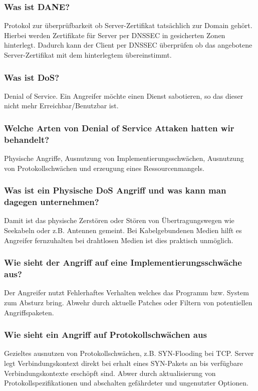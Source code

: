 	\subsubsection{Was ist DANE?}
	Protokol zur überprüfbarkeit ob Server-Zertifikat tatsächlich zur Domain gehört. Hierbei werden Zertifikate für Server per DNSSEC in gesicherten Zonen hinterlegt. Dadurch kann der Client per DNSSEC überprüfen ob das angebotene Server-Zertifikat mit dem hinterlegtem übereinstimmt.
	
	\subsubsection{Was ist DoS?}
	Denial of Service. Ein Angreifer möchte einen Dienst sabotieren, so das dieser nicht mehr Erreichbar/Benutzbar ist.
	
	\subsubsection{Welche Arten von Denial of Service Attaken hatten wir behandelt?}
	Physische Angriffe, Ausnutzung von Implementierungsschwächen, Ausnutzung von Protokollschwächen und erzeugung eines Ressourcenmangels.
	
	\subsubsection{Was ist ein Physische DoS Angriff und was kann man dagegen unternehmen?}
	Damit ist das physische Zerstören oder Stören von Übertragungswegen wie Seekabeln oder z.B. Antennen gemeint. Bei Kabelgebundenen Medien hilft es Angreifer fernzuhalten bei drahtlosen Medien ist dies praktisch unmöglich.
	
	\subsubsection{Wie sieht der Angriff auf eine Implementierungsschwäche aus?}
	Der Angreifer nutzt Fehlerhaftes Verhalten welches  das Programm bzw. System zum Absturz bring. Abwehr durch aktuelle Patches oder Filtern von potentiellen Angriffspaketen.
	
	\subsubsection{Wie sieht ein Angriff auf Protokollschwächen aus}
	Gezieltes ausnutzen von Protokollschwächen, z.B. SYN-Flooding bei TCP. Server legt Verbindungskontext direkt bei erhalt eines SYN-Pakets an bis verfügbare Verbindungskontexte erschöpft sind. Abwer durch aktualisierung von Protokollspezifikationen und abschalten gefährdeter und ungenutzter Optionen.
	
